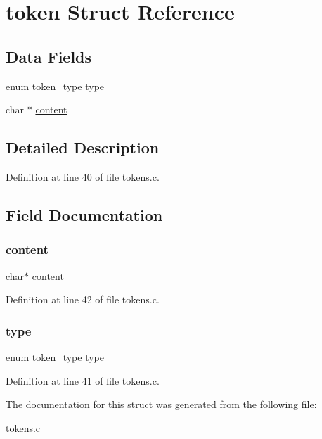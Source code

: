 \hypertarget{structtoken}{}\section{token Struct Reference}
\label{structtoken}
\subsection*{Data Fields}
\begin{DoxyCompactItemize}
\item 
enum \mbox{\hyperlink{tokens_8c_afe5ef662303b6b710ea6ee1a944bad0d}{token\+\_\+type}} \mbox{\hyperlink{structtoken_a239b01722e92fe2ca47a025485e55c7f}{type}}
\item 
char $\ast$ \mbox{\hyperlink{structtoken_ab0746fb6288bd31fd0d505fab48d8785}{content}}
\end{DoxyCompactItemize}


\subsection{Detailed Description}


Definition at line 40 of file tokens.\+c.



\subsection{Field Documentation}
\mbox{\label{structtoken_ab0746fb6288bd31fd0d505fab48d8785}} 
\subsubsection{\texorpdfstring{content}{content}}
{\footnotesize\ttfamily char$\ast$ content}



Definition at line 42 of file tokens.\+c.

\mbox{\label{structtoken_a239b01722e92fe2ca47a025485e55c7f}} 
\subsubsection{\texorpdfstring{type}{type}}
{\footnotesize\ttfamily enum \mbox{\hyperlink{tokens_8c_afe5ef662303b6b710ea6ee1a944bad0d}{token\+\_\+type}} type}



Definition at line 41 of file tokens.\+c.



The documentation for this struct was generated from the following file\+:\begin{DoxyCompactItemize}
\item 
\mbox{\hyperlink{tokens_8c}{tokens.\+c}}\end{DoxyCompactItemize}

